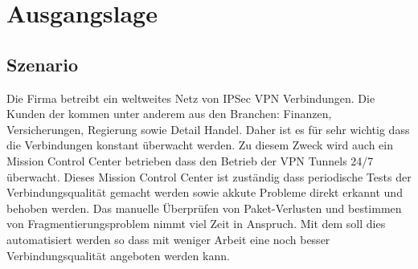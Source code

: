 \section{Ausgangslage}
\label{sec:Ausgangslage}

\subsection{Szenario}
Die Firma \osag betreibt ein weltweites Netz von \acs{IPSec} \acs{VPN} Verbindungen. Die Kunden der \osag kommen unter anderem aus den Branchen: Finanzen, Versicherungen, Regierung sowie Detail Handel. Daher ist es für \osag sehr wichtig dass die Verbindungen konstant überwacht werden. Zu diesem Zweck wird auch ein Mission Control Center betrieben dass den Betrieb der \acs{VPN} Tunnels 24/7 überwacht. Dieses Mission Control Center ist zuständig dass periodische Tests der Verbindungsqualität gemacht werden sowie akkute Probleme direkt erkannt und behoben werden. Das manuelle Überprüfen von Paket-Verlusten und bestimmen von Fragmentierungsproblem nimmt viel Zeit in Anspruch. Mit dem \tool soll dies automatisiert werden so dass mit weniger Arbeit eine noch besser Verbindungsqualität angeboten werden kann.

